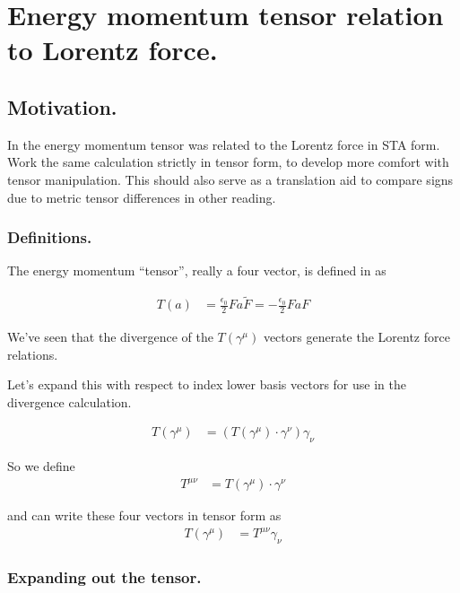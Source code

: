 \chapter{Energy momentum tensor relation to Lorentz force. }\label{chap:PJenMtensor}
\date{Feb 17, 2009.  enMTensor.tex}

\section{Motivation. }

In  the energy momentum tensor was related
to the Lorentz force in STA form.  Work the same calculation strictly in
tensor form, to
develop more comfort with tensor manipulation.  This should also serve
as a translation aid to compare signs due to metric tensor differences 
in other reading.

\subsection{Definitions. }

The energy momentum ``tensor'', really a four vector, is defined
in \cite{doran2003gap}
as

\begin{align}
T(a) &= 
\frac{\epsilon_0}{2} F a \tilde{F} = -\frac{\epsilon_0}{2} F a {F} 
\end{align}

We've seen that the divergence of the $T(\gamma^\mu)$ vectors generate
the Lorentz force relations.

Let's expand this with respect to index lower basis vectors for use in the
divergence calculation.

\begin{align}
T(\gamma^\mu) &= (T(\gamma^\mu) \cdot \gamma^\nu) \gamma_\nu 
\end{align}

So we define
\begin{align}
T^{\mu \nu} 
&= T(\gamma^\mu) \cdot \gamma^\nu
\end{align}

and can write these four vectors in tensor form as
\begin{align}
T(\gamma^\mu) &= T^{\mu \nu} \gamma_\nu 
\end{align}

\subsection{Expanding out the tensor. }

